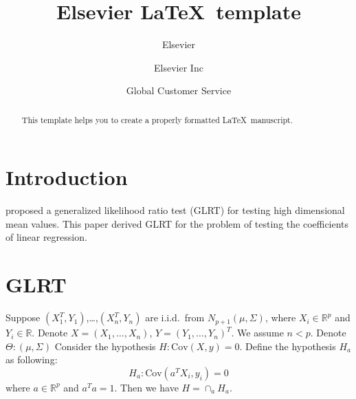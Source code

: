 \documentclass[review]{elsarticle}
\theoremstyle{plain}
\theoremstyle{definition}
\theoremstyle{remark}
\begin{document}
\begin{frontmatter}

\title{Elsevier \LaTeX\ template}

\author{Elsevier}
\address{Radarweg 29, Amsterdam}

\author[mymainaddress,mysecondaryaddress]{Elsevier Inc}

\author[mysecondaryaddress]{Global Customer Service}

\address[mymainaddress]{1600 John F Kennedy Boulevard, Philadelphia}
\address[mysecondaryaddress]{360 Park Avenue South, New York}

\begin{abstract}
This template helps you to create a properly formatted \LaTeX\ manuscript.
\end{abstract}

\begin{keyword}
\end{keyword}

\end{frontmatter}


\section{Introduction}
\cite{Zhao2016A} proposed a generalized likelihood ratio test (GLRT) for testing high dimensional mean values. This paper derived GLRT for the problem of testing the coefficients of linear regression.
\section{GLRT}
Suppose $(X_1^T,Y_1)$,\ldots,$(X_n^T, Y_n)$ are i.i.d.\ from $N_{p+1}(\mu,\Sigma)$,
where $X_i\in \mathbb{R}^p$ and $Y_i\in \mathbb{R}$. 
Denote $X=(X_1,\ldots,X_n)$, $Y={(Y_1,\ldots,Y_n)}^T$.
 We assume $n<p$. Denote $\Theta: (\mu,\Sigma)$
Consider the hypothesis $H: \textrm{Cov}(X,y)=0$. Define the hypothesis $H_a$ as following:
\begin{equation}
    H_a: \textrm{Cov}(a^T X_i, y_i)=0
\end{equation}
where $a\in \mathbb{R}^p$ and $a^T a=1$.
Then we have $H=\cap_a H_a$.
\end{document}
